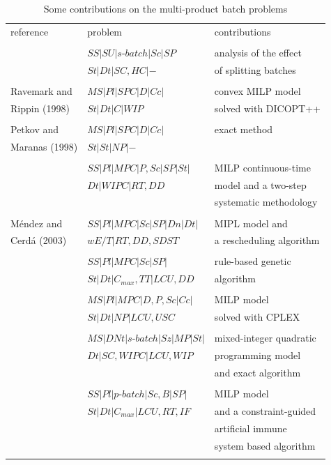 \documentclass[10pt,fleqn,a4paper,twoside]{article}
\begin{document}
\begin{table}[h!]
\begin{center}
\begin{small}
\begin{tabular}[c]{l l l}
reference & problem & contributions  \\
\cline {1-3} \\
\cite{Eilon1985} & $SS|SU|s\textrm{-}batch|Sc|SP$ &  analysis of the effect\\
& $St|Dt|SC, HC|-$  & of splitting batches \\
\cline {1-3} \\
Ravemark and & $MS|Pl|SPC|D|Cc|$ & convex MILP model \\
Rippin (1998) & $St|Dt|C|WIP$ & solved with DICOPT++ \\
\cline {1-3} \\
Petkov and & $MS|Pl|SPC|D|Cc|$ & exact method\\
Maranas (1998)  & $St|St|NP|-$ & \\
\cline {1-3} \\
\cite{MendezEtAll2000} & $SS|Pl|MPC|P,Sc|SP|St|$ & MILP continuous-time  \\
& $Dt|WIPC|RT, DD$ & model and a two-step  \\
& & systematic methodology \\
\cline {1-3} \\
Méndez and & $SS|Pl|MPC|Sc|SP|Dn|Dt|$ & MIPL model and \\
Cerdá (2003) &$wE/T|RT, DD, SDST$ & a rescheduling algorithm\\
\cline {1-3} \\
\cite{HeHui2008} & $SS|Pl|MPC|Sc|SP|$ & rule-based genetic \\
& $St|Dt|C_{max}, TT|LCU, DD$ & algorithm \\
\cline {1-3} \\
\cite{FumeroEtAl2016} & $MS|Pl|MPC|D,P,Sc|Cc|$ & MILP model \\
& $St|Dt|NP|LCU,USC$ & solved with CPLEX \\
\cline {1-3} \\
\cite{LiuEtAl2020} & $MS|DNt|s\textrm{-}batch|Sz|MP|St|$ & mixed-integer quadratic \\
& $Dt|SC,WIPC|LCU,WIP$ & programming model  \\
& & and exact algorithm \\
\cline {1-3} \\
\cite{LiEtAl2022} & $SS|Pl|p\textrm{-}batch|Sc,B|SP|$ & MILP model \\
& $St|Dt|C_{max}|LCU, RT, IF$ & and a constraint-guided \\
 & & artificial immune \\
 & & system based algorithm \\ 
\cline {1-3} \\
\end{tabular}
\caption{Some contributions on the multi-product batch problems}
\label{tab:review}
\end{small}
\end{center}
\end{table} 
\end{document}
